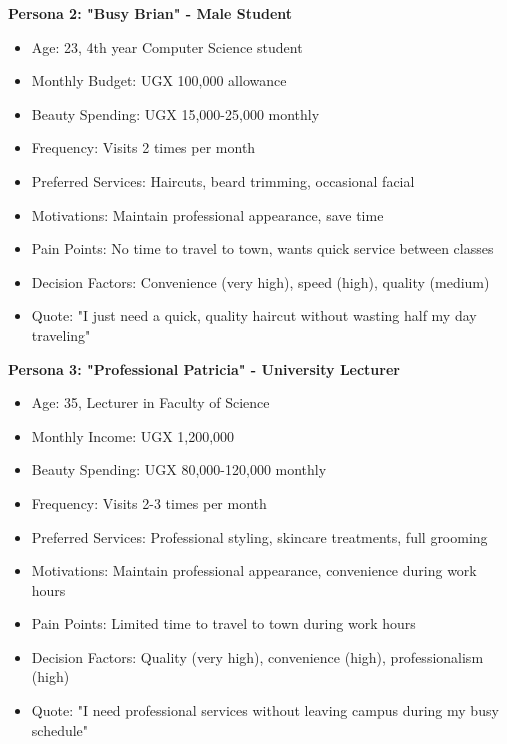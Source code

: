 \textbf{Persona 2: "Busy Brian" - Male Student}
\begin{itemize}[leftmargin=2em]
    \item Age: 23, 4th year Computer Science student
    \item Monthly Budget: UGX 100,000 allowance
    \item Beauty Spending: UGX 15,000-25,000 monthly
    \item Frequency: Visits 2 times per month
    \item Preferred Services: Haircuts, beard trimming, occasional facial
    \item Motivations: Maintain professional appearance, save time
    \item Pain Points: No time to travel to town, wants quick service between classes
    \item Decision Factors: Convenience (very high), speed (high), quality (medium)
    \item Quote: "I just need a quick, quality haircut without wasting half my day traveling"
\end{itemize}

\textbf{Persona 3: "Professional Patricia" - University Lecturer}
\begin{itemize}[leftmargin=2em]
    \item Age: 35, Lecturer in Faculty of Science
    \item Monthly Income: UGX 1,200,000
    \item Beauty Spending: UGX 80,000-120,000 monthly
    \item Frequency: Visits 2-3 times per month
    \item Preferred Services: Professional styling, skincare treatments, full grooming
    \item Motivations: Maintain professional appearance, convenience during work hours
    \item Pain Points: Limited time to travel to town during work hours
    \item Decision Factors: Quality (very high), convenience (high), professionalism (high)
    \item Quote: "I need professional services without leaving campus during my busy schedule"
\end{itemize}

